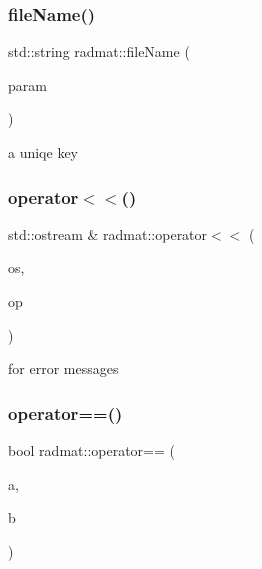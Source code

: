 \subsubsection{\texorpdfstring{fileName()}{fileName()}}
{\footnotesize\ttfamily std\+::string radmat\+::file\+Name (\begin{DoxyParamCaption}\item[{const \mbox{\hyperlink{structradmat_1_1RadmatExtendedKeyHadronNPartIrrep__t}{Radmat\+Extended\+Key\+Hadron\+N\+Part\+Irrep\+\_\+t}} \&}]{param }\end{DoxyParamCaption})}



a uniqe key 

\mbox{\label{namespaceradmat_a452f967dd14ae6fc0f7f9aa7ba04f8a0}} 
\subsubsection{\texorpdfstring{operator$<$$<$()}{operator<<()}}
{\footnotesize\ttfamily std\+::ostream \& radmat\+::operator$<$$<$ (\begin{DoxyParamCaption}\item[{std\+::ostream \&}]{os,  }\item[{const \mbox{\hyperlink{structradmat_1_1RadmatExtendedKeyHadronNPartIrrep__t}{Radmat\+Extended\+Key\+Hadron\+N\+Part\+Irrep\+\_\+t}} \&}]{op }\end{DoxyParamCaption})}



for error messages 

\mbox{\label{namespaceradmat_a33c106e5957a1e9d566afd6012f2d87e}} 
\subsubsection{\texorpdfstring{operator==()}{operator==()}}
{\footnotesize\ttfamily bool radmat\+::operator== (\begin{DoxyParamCaption}\item[{const \mbox{\hyperlink{structradmat_1_1RadmatMassOverlapData__t}{Radmat\+Mass\+Overlap\+Data\+\_\+t}} \&}]{a,  }\item[{const \mbox{\hyperlink{structradmat_1_1RadmatMassOverlapData__t}{Radmat\+Mass\+Overlap\+Data\+\_\+t}} \&}]{b }\end{DoxyParamCaption})}



